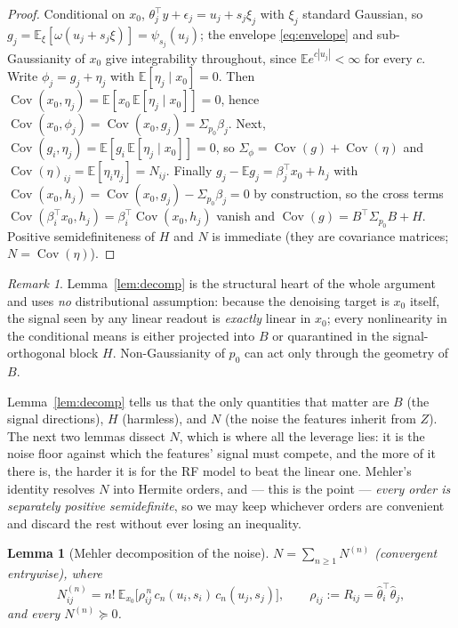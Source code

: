 \documentclass[11pt]{article}
\newtheorem{lemma}{Lemma}
\theoremstyle{remark}
\newtheorem{remark}{Remark}
\newcommand{\E}{\mathbb{E}}
\newcommand{\Cov}{\operatorname{Cov}}
\newcommand{\Sig}{\Sigma_{p_0}}
\begin{document}
\begin{proof}
Conditional on $x_0$, $\theta_j^\top y + \epsilon_j = u_j + s_j\xi_j$ with $\xi_j$ standard Gaussian, so $g_j = \E_\xi[\omega(u_j + s_j\xi)] = \psi_{s_j}(u_j)$; the envelope \eqref{eq:envelope} and sub-Gaussianity of $x_0$ give integrability throughout, since $\E e^{c|u_j|} < \infty$ for every $c$. Write $\phi_j = g_j + \eta_j$ with $\E[\eta_j \mid x_0] = 0$. Then $\Cov(x_0, \eta_j) = \E[x_0\,\E[\eta_j\mid x_0]] = 0$, hence $\Cov(x_0,\phi_j) = \Cov(x_0, g_j) = \Sig\beta_j$. Next, $\Cov(g_i, \eta_j) = \E[g_i\,\E[\eta_j \mid x_0]] = 0$, so $\Sigma_\phi = \Cov(g) + \Cov(\eta)$ and $\Cov(\eta)_{ij} = \E[\eta_i\eta_j] = N_{ij}$. Finally $g_j - \E g_j = \beta_j^\top x_0 + h_j$ with $\Cov(x_0, h_j) = \Cov(x_0,g_j) - \Sig\beta_j = 0$ by construction, so the cross terms $\Cov(\beta_i^\top x_0, h_j) = \beta_i^\top\Cov(x_0, h_j)$ vanish and $\Cov(g) = B^\top\Sig B + H$. Positive semidefiniteness of $H$ and $N$ is immediate (they are covariance matrices; $N = \Cov(\eta)$).
\end{proof}

\begin{remark}
Lemma~\ref{lem:decomp} is the structural heart of the whole argument and uses \emph{no} distributional assumption: because the denoising target is $x_0$ itself, the signal seen by any linear readout is \emph{exactly} linear in $x_0$; every nonlinearity in the conditional means is either projected into $B$ or quarantined in the signal-orthogonal block $H$. Non-Gaussianity of $p_0$ can act only through the geometry of $B$.
\end{remark}

\noindent Lemma~\ref{lem:decomp} tells us that the only quantities that matter are $B$ (the signal directions), $H$ (harmless), and $N$ (the noise the features inherit from $Z$). The next two lemmas dissect $N$, which is where all the leverage lies: it is the noise floor against which the features' signal must compete, and the more of it there is, the harder it is for the RF model to beat the linear one. Mehler's identity resolves $N$ into Hermite orders, and --- this is the point --- \emph{every order is separately positive semidefinite}, so we may keep whichever orders are convenient and discard the rest without ever losing an inequality.

\begin{lemma}[Mehler decomposition of the noise]\label{lem:mehler}
$N = \sum_{n \ge 1} N^{(n)}$ (convergent entrywise), where
\[
N^{(n)}_{ij} = n!\ \E_{x_0}\big[\rho_{ij}^{\,n}\, c_n(u_i, s_i)\, c_n(u_j, s_j)\big], \qquad \rho_{ij} := R_{ij} = \hat\theta_i^\top\hat\theta_j,
\]
and every $N^{(n)} \succeq 0$.
\end{lemma}
\end{document}

